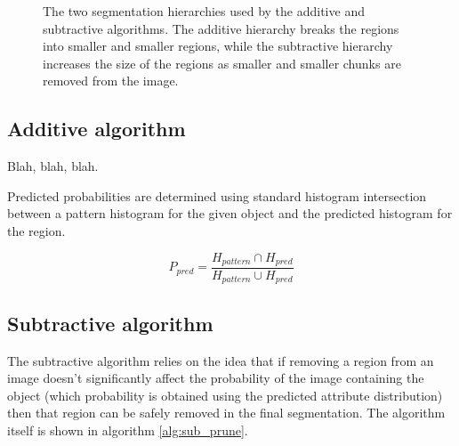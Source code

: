 \documentclass[10pt,twocolumn,letterpaper]{article}
\begin{document}
\begin{figure}
\label{fig:tree}
\centering
{}
\caption{The two segmentation hierarchies used by the additive 
and subtractive  algorithms.  The additive hierarchy breaks the
regions into smaller and smaller regions, while the subtractive hierarchy increases
the size of the regions as smaller and smaller chunks are removed from the image.}
\end{figure}

\subsection{Additive algorithm}

Blah, blah, blah.

Predicted probabilities are determined using standard histogram intersection 
between a pattern histogram for the given object and the predicted 
histogram for the region.

\[ P_{pred} = \frac{H_{pattern} \cap H_{pred}}{H_{pattern} \cup H_{pred}} \]

\subsection{Subtractive algorithm}

The subtractive algorithm relies on the idea that if removing a region from
an image doesn't significantly affect the probability of the image containing
the object (which probability is obtained using the predicted attribute 
distribution) then that region can be safely removed in the final segmentation.
The algorithm itself is shown in algorithm \ref{alg:sub_prune}.
\end{document}
